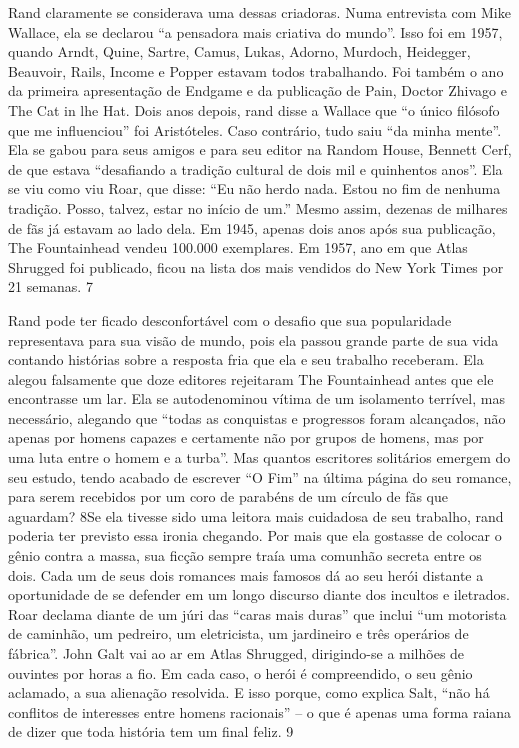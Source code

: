 
\par
 
Rand claramente se considerava uma dessas criadoras. Numa entrevista com Mike Wallace, ela se declarou “a pensadora mais criativa do mundo”. Isso foi em 1957, quando Arndt, Quine, Sartre, Camus, Lukas, Adorno, Murdoch, Heidegger, Beauvoir, Rails, Income e Popper estavam todos trabalhando. Foi também o ano da primeira apresentação de Endgame e da publicação de Pain, Doctor Zhivago e The Cat in lhe Hat. Dois anos depois, rand disse a Wallace que “o único filósofo que me influenciou” foi Aristóteles. Caso contrário, tudo saiu “da minha mente”. Ela se gabou para seus amigos e para seu editor na Random House, Bennett Cerf, de que estava “desafiando a tradição cultural de dois mil e quinhentos anos”. Ela se viu como viu Roar, que disse: “Eu não herdo nada. Estou no fim de nenhuma tradição. Posso, talvez, estar no início de um.” Mesmo assim, dezenas de milhares de fãs já estavam ao lado dela. Em 1945, apenas dois anos após sua publicação, The Fountainhead vendeu 100.000 exemplares. Em 1957, ano em que Atlas Shrugged foi publicado, ficou na lista dos mais vendidos do New York Times por 21 semanas.
 {\color{blue} 7}  

 
\par
 
Rand pode ter ficado desconfortável com o desafio que sua popularidade representava para sua visão de mundo, pois ela passou grande parte de sua vida contando histórias sobre a resposta fria que ela e seu trabalho receberam. Ela alegou falsamente que doze editores rejeitaram The Fountainhead antes que ele encontrasse um lar. Ela se autodenominou vítima de um isolamento terrível, mas necessário, alegando que “todas as conquistas e progressos foram alcançados, não apenas por homens capazes e certamente não por grupos de homens, mas por uma luta entre o homem e a turba”. Mas quantos escritores solitários emergem do seu estudo, tendo acabado de escrever “O Fim” na última página do seu romance, para serem recebidos por um coro de parabéns de um círculo de fãs que aguardam? 8Se ela tivesse sido uma leitora mais cuidadosa de seu trabalho, rand poderia ter previsto essa ironia chegando. Por mais que ela gostasse de colocar o gênio contra a massa, sua ficção sempre traía uma comunhão secreta entre os dois. Cada um de seus dois romances mais famosos dá ao seu herói distante a oportunidade de se defender em um longo discurso diante dos incultos e iletrados. Roar declama diante de um júri das “caras mais duras” que inclui “um motorista de caminhão, um pedreiro, um eletricista, um jardineiro e três operários de fábrica”. John Galt vai ao ar em Atlas Shrugged, dirigindo-se a milhões de ouvintes por horas a fio. Em cada caso, o herói é compreendido, o seu gênio aclamado, a sua alienação resolvida. E isso porque, como explica Salt, “não há conflitos de interesses entre homens racionais” – o que é apenas uma forma raiana de dizer que toda história tem um final feliz.
 {\color{blue} 9}  


